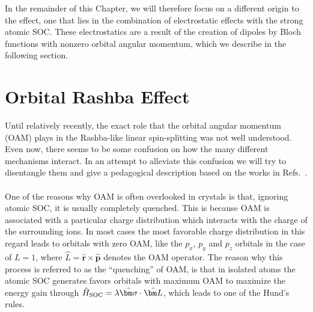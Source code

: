 In the remainder of this Chapter, we will therefore focus on a different origin to the effect, one that lies in the combination of electrostatic effects with the strong atomic SOC.
These electrostatics are a result of the creation of dipoles by Bloch functions with nonzero orbital angular momentum, which we describe in the following section. 
\section{Orbital Rashba Effect}
Until relatively recently, the exact role that the orbital angular momentum (OAM) plays in the Rashba-like linear spin-splitting was not well understood. Even now, there seems to be some confusion on how the many different mechanisms interact.   
In an attempt to alleviate this confusion we will try to disentangle them and give a pedagogical description based on the works in Refs.~\cite{Petersen2000,Park2011,Park2012,Kim2014,Park2015,Go2016}.
\\\\
One of the reasons why OAM is often overlooked in crystals is that, ignoring atomic SOC, it is usually completely quenched.
This is because OAM is associated with a particular charge distribution which interacts with the charge of the surrounding ions.
In most cases the most favorable charge distribution in this regard leads to orbitals with zero OAM, like the $p_x$, $p_y$ and $p_z$ orbitals in the case of $L=1$, where $\hat{L} = \hat{\bm r} \times \hat{\bm p}$ denotes the OAM operator.
The reason why this process is referred to as the ``quenching'' of OAM, is that in isolated atoms the atomic SOC generates favors orbitals with maximum OAM to maximize the energy gain through $\hat{H}_{\rm SOC} = \lambda \hat{\bm \sigma} \cdot \hat{\bm L}$, which leads to one of the Hund's rules.
